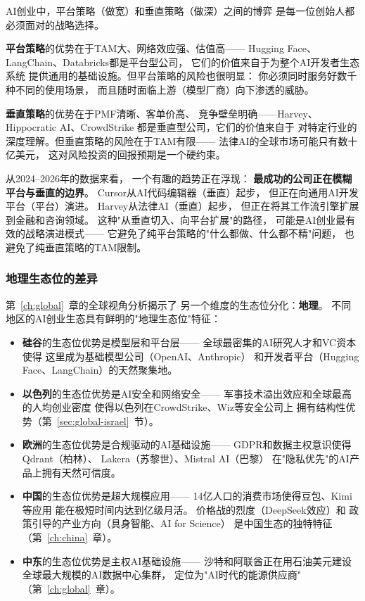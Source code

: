 AI创业中，平台策略（做宽）和垂直策略（做深）之间的博弈
是每一位创始人都必须面对的战略选择。

\textbf{平台策略}的优势在于TAM大、网络效应强、估值高——
Hugging Face、LangChain、Databricks都是平台型公司，
它们的价值来自于为整个AI开发者生态系统
提供通用的基础设施。但平台策略的风险也很明显：
你必须同时服务好数千种不同的使用场景，
而且随时面临上游（模型厂商）向下渗透的威胁。

\textbf{垂直策略}的优势在于PMF清晰、客单价高、
竞争壁垒明确——Harvey、Hippocratic AI、CrowdStrike
都是垂直型公司，它们的价值来自于
对特定行业的深度理解。但垂直策略的风险在于TAM有限——
法律AI的全球市场可能只有数十亿美元，
这对风险投资的回报预期是一个硬约束。

从2024--2026年的数据来看，
一个有趣的趋势正在浮现：
\textbf{最成功的公司正在模糊平台与垂直的边界}。
Cursor从AI代码编辑器（垂直）起步，
但正在向通用AI开发平台（平台）演进。
Harvey从法律AI（垂直）起步，
但正在将其工作流引擎扩展到金融和咨询领域。
这种"从垂直切入、向平台扩展"的路径，
可能是AI创业最有效的战略演进模式——
它避免了纯平台策略的"什么都做、什么都不精"问题，
也避免了纯垂直策略的TAM限制。

\subsubsection{地理生态位的差异}
第~\ref{ch:global}~章的全球视角分析揭示了
另一个维度的生态位分化：\textbf{地理}。
不同地区的AI创业生态具有鲜明的"地理生态位"特征：

\begin{itemize}
  \item \textbf{硅谷}的生态位优势是模型层和平台层——
    全球最密集的AI研究人才和VC资本使得
    这里成为基础模型公司（OpenAI、Anthropic）
    和开发者平台（Hugging Face、LangChain）的天然聚集地。
  \item \textbf{以色列}的生态位优势是AI安全和网络安全——
    军事技术溢出效应和全球最高的人均创业密度
    使得以色列在CrowdStrike、Wiz等安全公司上
    拥有结构性优势（第~\ref{sec:global-israel}~节）。
  \item \textbf{欧洲}的生态位优势是合规驱动的AI基础设施——
    GDPR和数据主权意识使得Qdrant（柏林）、
    Lakera（苏黎世）、Mistral AI（巴黎）
    在"隐私优先"的AI产品上拥有天然可信度。
  \item \textbf{中国}的生态位优势是超大规模应用——
    14亿人口的消费市场使得豆包、Kimi等应用
    能在极短时间内达到亿级月活。
    价格战的烈度（DeepSeek效应）和
    政策引导的产业方向（具身智能、AI for Science）
    是中国生态的独特特征
    （第~\ref{ch:china}~章）。
  \item \textbf{中东}的生态位优势是主权AI基础设施——
    沙特和阿联酋正在用石油美元建设
    全球最大规模的AI数据中心集群，
    定位为"AI时代的能源供应商"
    （第~\ref{ch:global}~章）。
\end{itemize}

